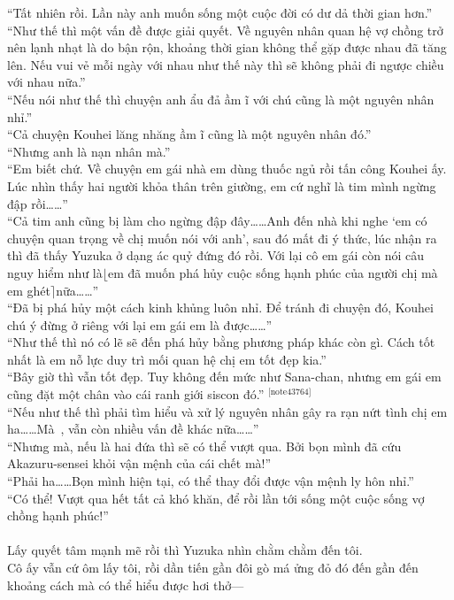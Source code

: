 \documentclass[12pt,a4paper, twosides]{book}
\begin{document}
“Tất nhiên rồi. Lần này anh muốn sống một cuộc đời có dư dả thời gian hơn.”\\
“Như thế thì một vấn đề được giải quyết. Về nguyên nhân quan hệ vợ chồng trở nên lạnh nhạt là do bận rộn, khoảng thời gian không thể gặp được nhau đã tăng lên. Nếu vui vẻ mỗi ngày với nhau như thế này thì sẽ không phải đi ngược chiều với nhau nữa.”\\
“Nếu nói như thế thì chuyện anh ẩu đả ầm ĩ với chú cũng là một nguyên nhân nhỉ.”\\
“Cả chuyện Kouhei lăng nhăng ầm ĩ cũng là một nguyên nhân đó.”\\
“Nhưng anh là nạn nhân mà.”\\
“Em biết chứ. Về chuyện em gái nhà em dùng thuốc ngủ rồi tấn công Kouhei ấy. Lúc nhìn thấy hai người khỏa thân trên giường, em cứ nghĩ là tim mình ngừng đập rồi……”\\
“Cả tim anh cũng bị làm cho ngừng đập đây……Anh đến nhà khi nghe ‘em có chuyện quan trọng về chị muốn nói với anh’, sau đó mất đi ý thức, lúc nhận ra thì đã thấy Yuzuka ở dạng ác quỷ đứng đó rồi. Với lại cô em gái còn nói câu nguy hiểm như là$\lfloor$em đã muốn phá hủy cuộc sống hạnh phúc của người chị mà em ghét$\rceil$nữa……”\\
“Đã bị phá hủy một cách kinh khủng luôn nhỉ. Để tránh đi chuyện đó, Kouhei chú ý đừng ở riêng với lại em gái em là được……”\\
“Như thế thì nó có lẽ sẽ đến phá hủy bằng phương pháp khác còn gì. Cách tốt nhất là em nỗ lực duy trì mối quan hệ chị em tốt đẹp kia.”\\
“Bây giờ thì vẫn tốt đẹp. Tuy không đến mức như Sana-chan, nhưng em gái em cũng đặt một chân vào cái ranh giới siscon đó.” $^\text{[note43764]}$\\
“Nếu như thế thì phải tìm hiểu và xử lý nguyên nhân gây ra rạn nứt tình chị em ha……Mà~, vẫn còn nhiều vấn đề khác nữa……”\\
“Nhưng mà, nếu là hai đứa thì sẽ có thể vượt qua. Bởi bọn mình đã cứu Akazuru-sensei khỏi vận mệnh của cái chết mà!”\\
“Phải ha……Bọn mình hiện tại, có thể thay đổi được vận mệnh ly hôn nhỉ.”\\
“Có thể! Vượt qua hết tất cả khó khăn, để rồi lần tới sống một cuộc sống vợ chồng hạnh phúc!”\\
\\
Lấy quyết tâm mạnh mẽ rồi thì Yuzuka nhìn chằm chằm đến tôi.\\
Cô ấy vẫn cứ ôm lấy tôi, rồi dần tiến gần đôi gò má ửng đỏ đó đến gần đến khoảng cách mà có thể hiểu được hơi thở—\\
\end{document}
